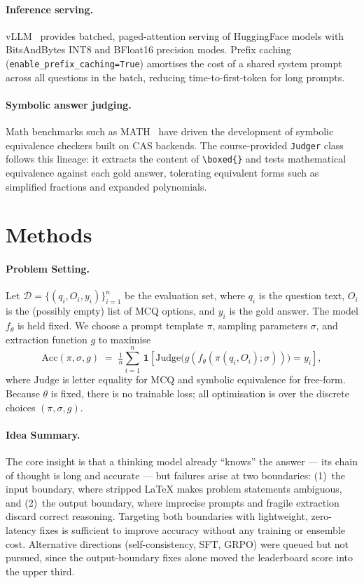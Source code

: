 \documentclass{article}
\begin{document}
\paragraph{Inference serving.}
vLLM~\citep{vllm} provides batched, paged-attention serving of HuggingFace
models with BitsAndBytes INT8 and BFloat16 precision modes.
Prefix caching (\texttt{enable\_prefix\_caching=True}) amortises the cost of
a shared system prompt across all questions in the batch, reducing
time-to-first-token for long prompts.

\paragraph{Symbolic answer judging.}
Math benchmarks such as MATH~\citep{hendrycks2021math} have driven the
development of symbolic equivalence checkers built on CAS backends.
The course-provided \texttt{Judger} class follows this lineage: it extracts
the content of \texttt{\textbackslash boxed\{\}} and tests mathematical
equivalence against each gold answer, tolerating equivalent forms such as
simplified fractions and expanded polynomials.


\section{Methods}
\label{sec:methods}

\paragraph{Problem Setting.}
Let $\mathcal{D}=\{(q_i,O_i,y_i)\}_{i=1}^{n}$ be the evaluation set, where
$q_i$ is the question text, $O_i$ is the (possibly empty) list of MCQ options,
and $y_i$ is the gold answer.
The model $f_\theta$ is held fixed.  We choose a prompt template $\pi$,
sampling parameters $\sigma$, and extraction function $g$ to maximise
\[
  \mathrm{Acc}(\pi,\sigma,g) \;=\; \tfrac{1}{n}\sum_{i=1}^{n}\,
    \mathbf{1}\!\left[\mathrm{Judge}\bigl(g(f_\theta(\pi(q_i,O_i);\sigma))\bigr) = y_i\right],
\]
where $\mathrm{Judge}$ is letter equality for MCQ and symbolic equivalence for
free-form.  Because $\theta$ is fixed, there is no trainable loss; all
optimisation is over the discrete choices $(\pi,\sigma,g)$.

\paragraph{Idea Summary.}
The core insight is that a thinking model already ``knows'' the answer —
its chain of thought is long and accurate — but failures arise at two
boundaries: (1)~the input boundary, where stripped LaTeX makes problem
statements ambiguous, and (2)~the output boundary, where imprecise prompts
and fragile extraction discard correct reasoning.
Targeting both boundaries with lightweight, zero-latency fixes is sufficient
to improve accuracy without any training or ensemble cost.
Alternative directions (self-consistency, SFT, GRPO) were queued but not
pursued, since the output-boundary fixes alone moved the leaderboard score
into the upper third.
\end{document}
